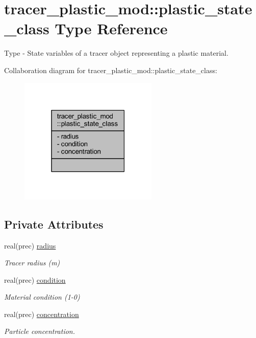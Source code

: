 \hypertarget{structtracer__plastic__mod_1_1plastic__state__class}{}\section{tracer\+\_\+plastic\+\_\+mod\+:\+:plastic\+\_\+state\+\_\+class Type Reference}
\label{structtracer__plastic__mod_1_1plastic__state__class}


Type -\/ State variables of a tracer object representing a plastic material.  




Collaboration diagram for tracer\+\_\+plastic\+\_\+mod\+:\+:plastic\+\_\+state\+\_\+class\+:\nopagebreak
\begin{figure}[H]
\begin{center}
\leavevmode
\includegraphics[width=187pt]{structtracer__plastic__mod_1_1plastic__state__class__coll__graph}
\end{center}
\end{figure}
\subsection*{Private Attributes}
\begin{DoxyCompactItemize}
\item 
real(prec) \mbox{\hyperlink{structtracer__plastic__mod_1_1plastic__state__class_a597b5dbe3ba58a0d58d7897fbadaea34}{radius}}
\begin{DoxyCompactList}\small\item\em Tracer radius (m) \end{DoxyCompactList}\item 
real(prec) \mbox{\hyperlink{structtracer__plastic__mod_1_1plastic__state__class_afd1aa02ed79b13a44724f5bd550debb7}{condition}}
\begin{DoxyCompactList}\small\item\em Material condition (1-\/0) \end{DoxyCompactList}\item 
real(prec) \mbox{\hyperlink{structtracer__plastic__mod_1_1plastic__state__class_a5eb0b91416c97191e62c5710beba6f8d}{concentration}}
\begin{DoxyCompactList}\small\item\em Particle concentration. \end{DoxyCompactList}\end{DoxyCompactItemize}


